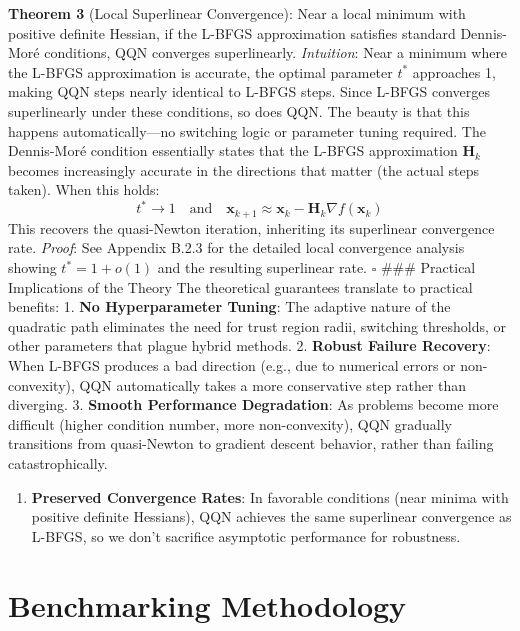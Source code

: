 \textbf{Theorem 3} (Local Superlinear Convergence): Near a local minimum with positive definite Hessian, if the L-BFGS approximation satisfies standard Dennis-Moré conditions, QQN converges superlinearly.
\emph{Intuition}: Near a minimum where the L-BFGS approximation is accurate, the optimal parameter \(t^*\) approaches 1, making QQN steps nearly identical to L-BFGS steps. Since L-BFGS converges superlinearly under these conditions, so does QQN. The beauty is that this happens automatically---no switching logic or parameter tuning required.
The Dennis-Moré condition essentially states that the L-BFGS approximation \(\mathbf{H}_k\) becomes increasingly accurate in the directions that matter (the actual steps taken). When this holds:
\[t^* \to 1 \quad \text{and} \quad \mathbf{x}_{k+1} \approx \mathbf{x}_k - \mathbf{H}_k\nabla f(\mathbf{x}_k)\]
This recovers the quasi-Newton iteration, inheriting its superlinear convergence rate.
\emph{Proof}: See Appendix B.2.3 for the detailed local convergence analysis showing \(t^* = 1 + o(1)\) and the resulting superlinear rate. \(\square\)
\#\#\# Practical Implications of the Theory
The theoretical guarantees translate to practical benefits:
1. \textbf{No Hyperparameter Tuning}: The adaptive nature of the quadratic path eliminates the need for trust region radii, switching thresholds, or other parameters that plague hybrid methods.
2. \textbf{Robust Failure Recovery}: When L-BFGS produces a bad direction (e.g., due to numerical errors or non-convexity), QQN automatically takes a more conservative step rather than diverging.
3. \textbf{Smooth Performance Degradation}: As problems become more difficult (higher condition number, more non-convexity), QQN gradually transitions from quasi-Newton to gradient descent behavior, rather than failing catastrophically.

\begin{enumerate}
\def\labelenumi{\arabic{enumi}.}
\setcounter{enumi}{3}
\tightlist
\item
  \textbf{Preserved Convergence Rates}: In favorable conditions (near minima with positive definite Hessians), QQN achieves the same superlinear convergence as L-BFGS, so we don't sacrifice asymptotic performance for robustness.
\end{enumerate}

\hypertarget{benchmarking-methodology}{%
\section{Benchmarking Methodology}\label{benchmarking-methodology}}

